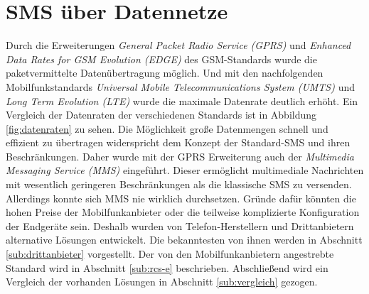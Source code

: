\documentclass[german,12pt,a4paper]{article}
\begin{document}





\section{SMS über Datennetze} %
\label{sec:datennetze}

Durch die Erweiterungen \textit{General Packet Radio Service (GPRS)} und
\textit{Enhanced Data Rates for GSM Evolution (EDGE)} des GSM-Standards wurde die
paketvermittelte Datenübertragung möglich. Und mit den nachfolgenden Mobilfunkstandards
\textit{Universal Mobile Telecommunications System (UMTS)} und \textit{Long Term
Evolution (LTE)} wurde die maximale Datenrate deutlich erhöht. Ein Vergleich der Datenraten
der verschiedenen Standards ist in Abbildung \ref{fig:datenraten} zu sehen. Die Möglichkeit
große Datenmengen schnell und effizient zu übertragen widerspricht dem Konzept der Standard-SMS
und ihren Beschränkungen. Daher wurde mit der GPRS Erweiterung auch der \textit{Multimedia
Messaging Service (MMS)} eingeführt. Dieser ermöglicht multimediale Nachrichten
mit wesentlich geringeren Beschränkungen als die klassische SMS zu versenden. Allerdings
konnte sich MMS nie wirklich durchsetzen. Gründe dafür könnten die hohen Preise der
Mobilfunkanbieter oder die teilweise komplizierte Konfiguration der Endgeräte sein. Deshalb wurden
von Telefon-Herstellern und Drittanbietern alternative Lösungen entwickelt. Die
bekanntesten von ihnen werden in Abschnitt \ref{sub:drittanbieter} vorgestellt. Der von den
Mobilfunkanbietern angestrebte Standard wird in Abschnitt \ref{sub:rcs-e} beschrieben.
Abschließend wird ein Vergleich der vorhanden Lösungen in Abschnitt \ref{sub:vergleich}
gezogen.
\end{document}
